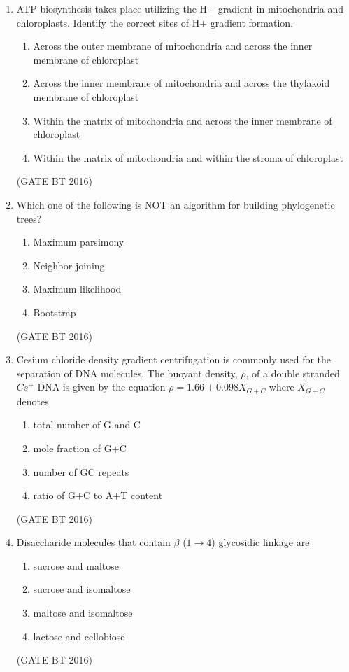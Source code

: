 \documentclass[journal,12pt,onecolumn]{IEEEtran}
\theoremstyle{remark}
\begin{document}
\begin{enumerate}
\item ATP biosynthesis takes place utilizing the H+ gradient in mitochondria and chloroplasts. Identify the correct sites of H+ gradient formation.
\begin{multicols}{2}
\begin{enumerate}
\item  Across the outer membrane of mitochondria and across the inner membrane of chloroplast
\item  Across the inner membrane of mitochondria and across the thylakoid membrane of chloroplast
\item  Within the matrix of mitochondria and across the inner membrane of chloroplast
\item  Within the matrix of mitochondria and within the stroma of chloroplast
\end{enumerate}
\end{multicols} \hfill(GATE BT 2016)   

\item Which one of the following is NOT an algorithm for building phylogenetic trees?
\begin{multicols}{2}
\begin{enumerate}
\item Maximum parsimony	
\item Neighbor joining
\item  Maximum likelihood	
\item  Bootstrap
\end{enumerate}
\end{multicols} \hfill(GATE BT 2016)  

\item Cesium chloride density gradient centrifugation is commonly used for the separation of DNA molecules. The buoyant density, $\rho$, of a double stranded $Cs^+$ DNA is given by the equation $\rho$$= 1.66 + 0.098X_{G+C}$
where $X_{G+C}$ denotes
\begin{multicols}{2}
\begin{enumerate}
\item total number of G and C	
\item  mole fraction of G$+$C
\item  number of GC repeats	
\item ratio of G$+$C to A$+$T content
\end{enumerate}
\end{multicols} \hfill(GATE BT 2016)  

\item Disaccharide molecules that contain $\beta$ ($1\rightarrow 4$) glycosidic linkage are
\begin{multicols}{2}
\begin{enumerate}
\item sucrose and maltose	
\item  sucrose and isomaltose
\item maltose and isomaltose
\item lactose and cellobiose
\end{enumerate}
\end{multicols} \hfill(GATE BT 2016)   


\end{enumerate}
\end{document}
